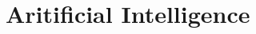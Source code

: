 \documentclass{format/laszewski}
\begin{document}
\part{Aritificial Intelligence}



%
%
%
%


%
%
%

%



%
%
%


\begin{comment}

















\end{comment}

\begin{comment}









\end{comment}

%
%

%

%



\cite{www-sharelatex}
\end{document}
